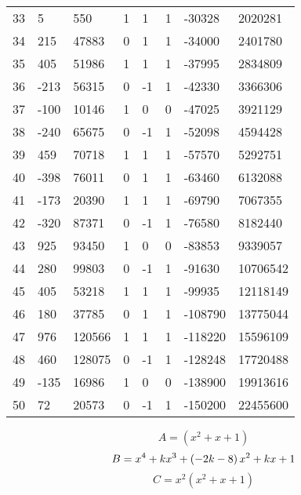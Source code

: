 \documentclass{amsart}
\begin{document}
\begin{longtable}{|l|l|l|lllll|}
33&5&550&1&1&1&-30328&2020281\\
34&215&47883&0&1&1&-34000&2401780\\
35&405&51986&1&1&1&-37995&2834809\\
36&-213&56315&0&-1&1&-42330&3366306\\
37&-100&10146&1&0&0&-47025&3921129\\
38&-240&65675&0&-1&1&-52098&4594428\\
39&459&70718&1&1&1&-57570&5292751\\
40&-398&76011&0&1&1&-63460&6132088\\
41&-173&20390&1&1&1&-69790&7067355\\
42&-320&87371&0&-1&1&-76580&8182440\\
43&925&93450&1&0&0&-83853&9339057\\
44&280&99803&0&-1&1&-91630&10706542\\
45&405&53218&1&1&1&-99935&12118149\\
46&180&37785&0&1&1&-108790&13775044\\
47&976&120566&1&1&1&-118220&15596109\\
48&460&128075&0&-1&1&-128248&17720488\\
49&-135&16986&1&0&0&-138900&19913616\\
50&72&20573&0&-1&1&-150200&22455600\\
\hline
\end{longtable}
$$A=(x^2
 + x
 + 1)$$
$$B=x^4
 + k\*x^3
 + \left(-2\*k
 - 8\right) \*x^2
 + k\*x
 + 1$$
$$C=x^2(x^2
 + x
 + 1)$$
\end{document}
